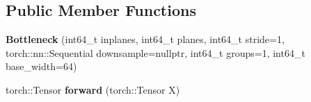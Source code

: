 \subsection*{Public Member Functions}
\begin{DoxyCompactItemize}
\item 
\mbox{\label{structvision_1_1models_1_1__resnetimpl_1_1Bottleneck_a3b00139cb34be325a5c78f44b82cf2b9}} 
{\bfseries Bottleneck} (int64\+\_\+t inplanes, int64\+\_\+t planes, int64\+\_\+t stride=1, torch\+::nn\+::\+Sequential downsample=nullptr, int64\+\_\+t groups=1, int64\+\_\+t base\+\_\+width=64)
\item 
\mbox{\label{structvision_1_1models_1_1__resnetimpl_1_1Bottleneck_ac3da1ce5c5518aa7f595b48d259e5c5e}} 
torch\+::\+Tensor {\bfseries forward} (torch\+::\+Tensor X)
\end{DoxyCompactItemize}
